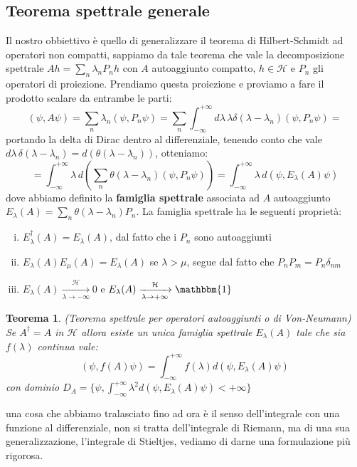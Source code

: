 \documentclass[12pt]{book}
\theoremstyle{plain}
\renewcommand{\H}{\mathcal{H}}
\newtheorem{thm}{Teorema}[section]
\theoremstyle{definition}
\theoremstyle{remark}
\begin{document}
\subsection{Teorema spettrale generale}
Il nostro obbiettivo è quello di generalizzare il teorema di Hilbert-Schmidt ad operatori non compatti, sappiamo da tale teorema che vale la decomposizione spettrale $Ah = \sum_n \lambda_n P_n h$ con $A$ autoaggiunto compatto, $h\in\H$ e $P_n$ gli operatori di proiezione. Prendiamo questa proiezione e proviamo a fare il prodotto scalare da entrambe le parti:
\[(\psi, A\psi) = \sum_n \lambda_n (\psi,P_n\psi) = \sum_n \int_{-\infty}^{+\infty}d\lambda\, \lambda \delta(\lambda -\lambda_n)(\psi,P_n\psi)=\]
portando la delta di Dirac dentro al differenziale, tenendo conto che vale $d\lambda\,\delta(\lambda-\lambda_n) = d(\theta(\lambda - \lambda_n))$, otteniamo:
\[ =\int_{-\infty}^{+\infty} \lambda\, d\left(\sum_n \theta(\lambda -\lambda_n)(\psi,P_n\psi)\right) = \int_{-\infty}^{+\infty} \lambda\, d(\psi,E_\lambda(A)\psi)\]
dove abbiamo definito la \textbf{famiglia spettrale} associata ad $A$ autoaggiunto $E_\lambda(A) = \sum_n \theta(\lambda-\lambda_n)P_n$. La famiglia spettrale ha le seguenti proprietà:
\begin{enumerate}[i.]
\item $E_\lambda^\dagger(A) = E_\lambda(A)$, dal fatto che i $P_n$ sono autoaggiunti
\item $E_\lambda(A)E_\mu(A) = E_\lambda(A)$ se $\lambda>\mu$, segue dal fatto che $P_nP_m = P_n\delta_{nm}$
\item $E_\lambda(A)\xrightarrow[\lambda\to -\infty]{\H} 0$ e $E_\lambda(A)\xrightarrow[\lambda\to +\infty]{\H} \mathbbm{1}$
\end{enumerate}
\begin{thm}(Teorema spettrale per operatori autoaggiunti o di Von-Neumann)
Se $A^\dagger = A$ in $\H$ allora esiste un unica famiglia spettrale $E_\lambda(A)$ tale che sia $f(\lambda)$ continua vale:
\[(\psi,f(A)\psi) = \int_{-\infty}^{+\infty}f(\lambda)d(\psi,E_\lambda(A)\psi) \]
con dominio $D_A = \{\psi,\displaystyle\int_{-\infty}^{+\infty} \lambda^2 d(\psi,E_\lambda(A)\psi) <+\infty\}$
\end{thm}
una cosa che abbiamo tralasciato fino ad ora è il senso dell'integrale con una funzione al differenziale, non si tratta dell'integrale di Riemann, ma di una sua generalizzazione, l'integrale di Stieltjes, vediamo di darne una formulazione più rigorosa.
\end{document}
